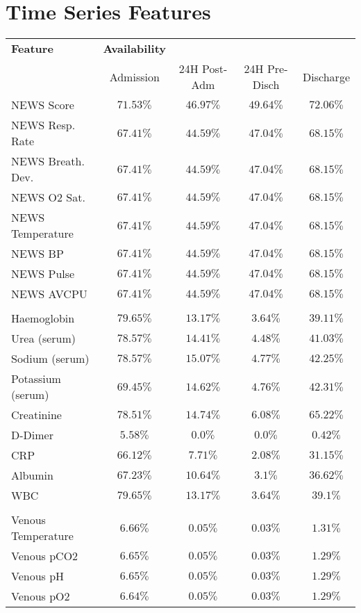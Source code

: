 \documentclass[hf]{ceurart}
\begin{document}
\section{Time Series Features}
\setlength{\LTleft}{-20cm plus -1fill}
\setlength{\LTright}{\LTleft}
\begin{longtable}{lcccc}
\hline
\textbf{Feature} & \textbf{Availability} \\
& Admission & 24H Post-Adm & 24H Pre-Disch & Discharge\\ \hline
\endhead
%
\hline
\endfoot
%
\endlastfoot
%
NEWS Score & $71.53\%$ & $46.97\%$ & $49.64\%$ & $72.06\%$ \\
NEWS Resp. Rate & $67.41\%$ & $44.59\%$ & $47.04\%$ & $68.15\%$ \\
NEWS Breath. Dev. & $67.41\%$ & $44.59\%$ & $47.04\%$ & $68.15\%$ \\
NEWS O2 Sat. & $67.41\%$ & $44.59\%$ & $47.04\%$ & $68.15\%$ \\
NEWS Temperature & $67.41\%$ & $44.59\%$ & $47.04\%$ & $68.15\%$ \\
NEWS BP & $67.41\%$ & $44.59\%$ & $47.04\%$ & $68.15\%$ \\
NEWS Pulse & $67.41\%$ & $44.59\%$ & $47.04\%$ & $68.15\%$ \\
NEWS AVCPU & $67.41\%$ & $44.59\%$ & $47.04\%$ & $68.15\%$ \\
\\
Haemoglobin & $79.65\%$ & $13.17\%$ & $3.64\%$ & $39.11\%$ \\
Urea (serum) & $78.57\%$ & $14.41\%$ & $4.48\%$ & $41.03\%$ \\
Sodium (serum) & $78.57\%$ & $15.07\%$ & $4.77\%$ & $42.25\%$ \\
Potassium (serum) & $69.45\%$ & $14.62\%$ & $4.76\%$ & $42.31\%$ \\
Creatinine & $78.51\%$ & $14.74\%$ & $6.08\%$ & $65.22\%$ \\
D-Dimer & $5.58\%$ & $0.0\%$ & $0.0\%$ & $0.42\%$ \\
CRP     & $66.12\%$ & $7.71\%$ & $2.08\%$ & $31.15\%$ \\
Albumin & $67.23\%$ & $10.64\%$ & $3.1\%$ & $36.62\%$ \\
WBC & $79.65\%$ & $13.17\%$ & $3.64\%$ & $39.1\%$ \\
\\
Venous Temperature & $6.66\%$ & $0.05\%$ & $0.03\%$ & $1.31\%$ \\
Venous pCO2 & $6.65\%$ & $0.05\%$ & $0.03\%$ & $1.29\%$ \\
Venous pH & $6.65\%$ & $0.05\%$ & $0.03\%$ & $1.29\%$ \\
Venous pO2 & $6.64\%$ & $0.05\%$ & $0.03\%$ & $1.29\%$ \\
\hline
\end{longtable}
\end{document}
